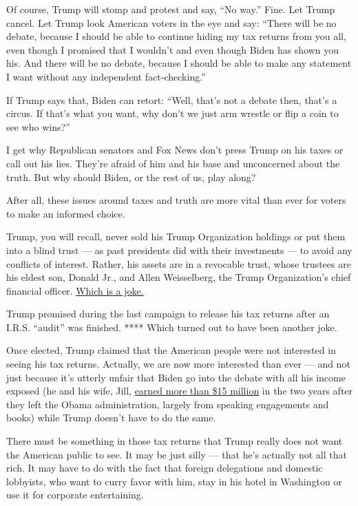 Of course, Trump will stomp and protest and say, ``No way.'' Fine. Let
Trump cancel. Let Trump look American voters in the eye and say: ``There
will be no debate, because I should be able to continue hiding my tax
returns from you all, even though I promised that I wouldn't and even
though Biden has shown you his. And there will be no debate, because I
should be able to make any statement I want without any independent
fact-checking.''

If Trump says that, Biden can retort: ``Well, that's not a debate then,
that's a circus. If that's what you want, why don't we just arm wrestle
or flip a coin to see who wins?''

I get why Republican senators and Fox News don't press Trump on his
taxes or call out his lies. They're afraid of him and his base and
unconcerned about the truth. But why should Biden, or the rest of us,
play along?

After all, these issues around taxes and truth are more vital than ever
for voters to make an informed choice.

Trump, you will recall, never sold his Trump Organization holdings or
put them into a blind trust --- as past presidents did with their
investments --- to avoid any conflicts of interest. Rather, his assets
are in a revocable trust, whose trustees are his eldest son, Donald Jr.,
and Allen Weisselberg, the Trump Organization's chief financial officer.
\href{https://www.npr.org/2017/04/03/522511211/change-to-president-trumps-trust-lets-him-tap-business-profits}{Which
is a joke.}

Trump promised during the last campaign to release his tax returns after
an I.R.S. ``audit'' was finished. **** Which turned out to have been
another joke.

Once elected, Trump claimed that the American people were not interested
in seeing his tax returns. Actually, we are now more interested than
ever --- and not just because it's utterly unfair that Biden go into the
debate with all his income exposed (he and his wife, Jill,
\href{https://www.cnbc.com/2019/07/09/joe-biden-releases-tax-returns-during-2020-democratic-primary.html}{earned
more than \$15 million} in the two years after they left the Obama
administration, largely from speaking engagements and books) while Trump
doesn't have to do the same.

There must be something in those tax returns that Trump really does not
want the American public to see. It may be just silly --- that he's
actually not all that rich. It may have to do with the fact that foreign
delegations and domestic lobbyists, who want to curry favor with him,
stay in his hotel in Washington or use it for corporate entertaining.

